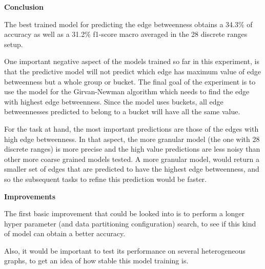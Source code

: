 \newpage
\textbf{Conclusion}

The best trained model for predicting the edge betweenness obtains a 34.3\% of accuracy as well as a 31.2\% f1-score macro averaged in the 28 discrete ranges setup.

One important negative aspect of the models trained so far in this experiment, is that the predictive model will not predict which edge has maximum value of edge betweenness but a whole group or bucket. The final goal of the experiment is to use the model for the Girvan-Newman algorithm which needs to find the edge with highest edge betweenness. Since the model uses buckets, all edge betweennesses predicted to belong to a bucket will have all the same value. 

For the task at hand, the most important predictions are those of the edges with high edge betweenness. In that aspect, the more granular model (the one with 28 discrete ranges) is more precise and the high value predictions are less noisy than other more coarse grained models tested. A more granular model, would return a smaller set of edges that are predicted to have the highest edge betweenness, and so the subsequent tasks to refine this prediction would be faster.


\textbf{Improvements}

The first basic improvement that could be looked into is to perform a longer hyper parameter (and data partitioning configuration) search, to see if this kind of model can obtain a better accuracy. 



Also, it would be important to test its performance on several heterogeneous graphs, to get an idea of how stable this model training is.


